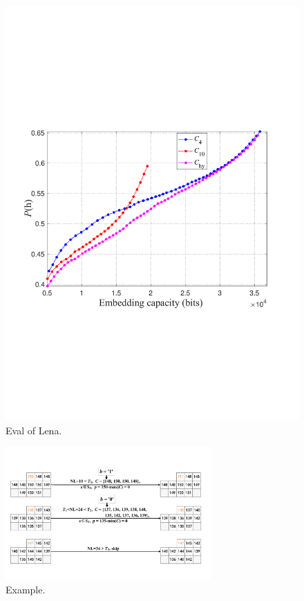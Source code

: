 \documentclass[review,3p,10pt,sort&compress]{elsarticle}
\begin{document}
\begin{figure}
\centering
    \begin{minipage}[t]{0.5\linewidth}
    \centering
    \includegraphics[width=1\textwidth]{figures/PropLenaNoT.pdf}
    \end{minipage}
\centering
\caption{Eval of Lena.}
\label{Fig.Eval0}
\end{figure}

\begin{figure}
\centering
\includegraphics[width=0.7\textwidth]{figures/EmbedwithTh.pdf}
\centering
\caption{Example.}
\label{Fig.EmbedExample}
\end{figure}
\end{document}
